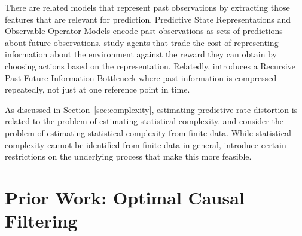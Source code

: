 \documentclass[entropy,article,submit,moreauthors,pdftex,10pt,a4paper]{Definitions/mdpi}
\begin{document}
There are related models that represent past observations by extracting those features that are relevant for prediction.
Predictive State Representations \citep{singh-learning-2003,singh-predictive-2004} and Observable Operator Models \citep{jaeger1998discrete} encode past observations as sets of predictions about future observations.
\citet{rubin2012trading} study agents that trade the cost of representing information about the environment against the reward they can obtain by choosing actions based on the representation.
Relatedly, \citet{still-information-2014} introduces a Recursive Past Future Information Bottleneck where past information is compressed repeatedly, not just at one reference point in time.


As discussed in Section~\ref{sec:complexity}, estimating predictive rate-distortion is related to the problem of estimating statistical complexity.
\citet{clarke2003application} and \citet{still-optimal-2010} consider the problem of estimating statistical complexity from finite data.
While statistical complexity cannot be identified from finite data in general, \citet{clarke2003application} introduce certain restrictions on the underlying process that make this more feasible.





\section{Prior Work: Optimal Causal Filtering}\label{sec:OCF}
\end{document}
